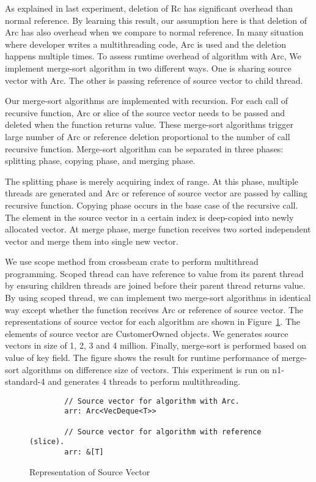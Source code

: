 As explained in last experiment, deletion of Rc has significant overhead than normal reference. 
By learning this result, our assumption here is that deletion of Arc has also overhead when we compare to normal reference. 
In many situation where developer writes a multithreading code, Arc is used and the deletion happens multiple times. 
To assess runtime overhead of algorithm with Arc, We implement merge-sort algorithm in two different ways. 
One is sharing source vector with Arc. The other is passing reference of source vector to child thread. 

Our merge-sort algorithms are implemented with recursion. For each call of recursive function, 
Arc or slice of the source vector needs to be passed and deleted when the function returns value. 
These merge-sort algorithms trigger large number of Arc or reference deletion proportional to the number of call recursive function.
Merge-sort algorithm can be separated in three phases: splitting phase, copying phase, and merging phase. 

The splitting phase is merely acquiring index of range. At this phase, multiple threads are generated and Arc or reference of source vector are passed by calling recursive function. 
Copying phase occurs in the base case of the recursive call. The element in the source vector in a certain index is deep-copied into newly allocated vector.
At merge phase, merge function receives two sorted independent vector and merge them into single new vector.

We use scope method from crossbeam crate to perform multithread programming. 
Scoped thread can have reference to value from its parent thread by ensuring children threads are joined before their parent thread returns value. 
By using scoped thread, we can implement two merge-sort algorithms in identical way except whether the function receives Arc or reference of source vector.
The representations of source vector for each algorithm are shown in Figure~\ref{fig:source_merge_sort}.
The elements of source vector are CustomerOwned objects. We generates source vectors in size of 1, 2, 3 and 4 million.
Finally, merge-sort is performed based on value of key field. The figure shows the result for runtime performance of merge-sort algorithms on difference size of vectors. 
This experiment is run on n1-standard-4 and generates 4 threads to perform multithreading.

\begin{figure}[htb]
    \begin{lstlisting}
        // Source vector for algorithm with Arc.
        arr: Arc<VecDeque<T>>

        // Source vector for algorithm with reference (slice).
        arr: &[T]
    \end{lstlisting}
    \caption{Representation of Source Vector}
    \label{fig:source_merge_sort}
\end{figure}



